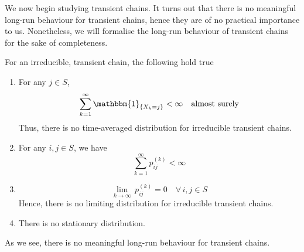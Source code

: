 \documentclass[12pt]{article}
\theoremstyle{definition}
\begin{document}
We now begin studying transient chains. It turns out that there is no meaningful long-run behaviour for transient chains, hence they are of no practical importance to us. Nonetheless, we will formalise the long-run behaviour of transient chains for the sake of completeness. 

\begin{thm} \label{thm:transient_long_run}
    For an irreducible, transient chain, the following hold true
    
    \begin{enumerate}
        \item For any $j \in S$, 
        \[
            \sum_{k=1}^{\infty} \mathbbm{1}_{\left\{ X_k = j \right\}} < \infty \quad \text{almost surely}
        \]
        Thus, there is no time-averaged distribution for irreducible transient chains.
        
        \item For any $i,j \in S$, we have
        \[
            \sum_{k=1}^{\infty} p_{ij}^{(k)} < \infty
        \]
        
        \item \[
            \lim_{k \to \infty} \, p_{ij}^{(k)} = 0 \quad \forall \, i,j \in S
        \]
        Hence, there is no limiting distribution for irreducible transient chains. 
        
        \item There is no stationary distribution.
    \end{enumerate}
\end{thm}

As we see, there is no meaningful long-run behaviour for transient chains. 
\end{document}

